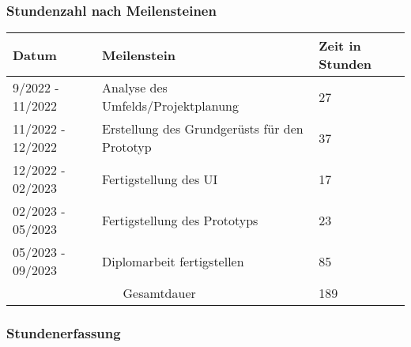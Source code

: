 \subsubsection{Stundenzahl nach Meilensteinen}

\begin{tabular}{|m{}|m{}|m{}|}
    \hline
    \cellcolor{gray!10} Datum & \cellcolor{gray!10} Meilenstein & \cellcolor{gray!10} Zeit in Stunden \\
    \hline
    9/2022 - 11/2022 & Analyse des Umfelds/Projektplanung & 27 \\
    \hline
    11/2022 - 12/2022 & Erstellung des Grundgerüsts für den Prototyp & 37 \\
    \hline
    12/2022 - 02/2023 & Fertigstellung des UI & 17 \\
    \hline
    02/2023 - 05/2023 & Fertigstellung des Prototyps & 23 \\
    \hline
    05/2023 - 09/2023 & Diplomarbeit fertigstellen & 85 \\ 
    \hline
    \multicolumn{2}{|c|}{\cellcolor{gray!30}Gesamtdauer} & 189 \\
    \hline
\end{tabular}

\noindent

\vspace{40pt}

\subsubsection{Stundenerfassung}

